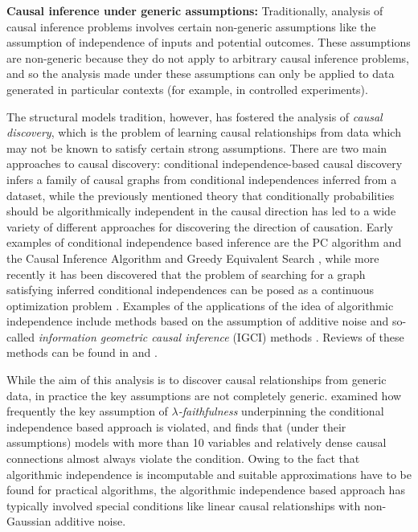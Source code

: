 \textbf{Causal inference under generic assumptions:} Traditionally, analysis of causal inference problems involves certain non-generic assumptions like the assumption of independence of inputs and potential outcomes. These assumptions are non-generic because they do not apply to arbitrary causal inference problems, and so the analysis made under these assumptions can only be applied to data generated in particular contexts (for example, in controlled experiments).

The structural models tradition, however, has fostered the analysis of \emph{causal discovery}, which is the problem of learning causal relationships from data which may not be known to satisfy certain strong assumptions. There are two main approaches to causal discovery: conditional independence-based causal discovery infers a family of causal graphs from conditional independences inferred from a dataset, while the previously mentioned theory that conditionally probabilities should be algorithmically independent in the causal direction has led to a wide variety of different approaches for discovering the direction of causation. Early examples of conditional independence based inference are the PC algorithm and the Causal Inference Algorithm \citep[Ch. 5 \& 6]{spirtes_causation_1993} and Greedy Equivalent Search \citep{chickering_optimal_2003,chickering_learning_2002}, while more recently it has been discovered that the problem of searching for a graph satisfying inferred conditional independences can be posed as a continuous optimization problem \citep{zheng_dags_2018,ng_graph_2019}. Examples of the applications of the idea of algorithmic independence include methods based on the assumption of additive noise \citep{hoyer_nonlinear_2009,shimizu_linear_2006} and so-called \emph{information geometric causal inference} (IGCI) methods \citep{daniusis_inferring_2012}. Reviews of these methods can be found in \citep[ch. 4, 5, 6 \& 7]{peters_elements_2017} and \citep{mooij_j.m._distinguishing_2016}.

While the aim of this analysis is to discover causal relationships from generic data, in practice the key assumptions are not completely generic. \citet{uhler_geometry_2013} examined how frequently the key assumption of $\lambda$\emph{-faithfulness} underpinning the conditional independence based approach is violated, and finds that (under their assumptions) models with more than 10 variables and relatively dense causal connections almost always violate the condition. Owing to the fact that algorithmic independence is incomputable and suitable approximations have to be found for practical algorithms, the algorithmic independence based approach has typically involved special conditions like linear causal relationships with non-Gaussian additive noise.


